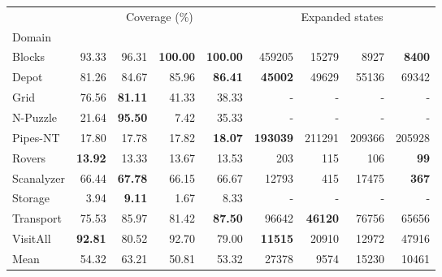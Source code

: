 \begin{tabular}{lrrrrrrrr}
    & \multicolumn{4}{c}{Coverage (\%)} & \multicolumn{4}{c}{Expanded states} \\
    \cmidrule(lr){2-5} \cmidrule(lr){6-9}
    Domain & \hnnl{\rlfacts} & \hnnl{\rlmeanfx} & \hnnnomutexl{\rlfacts} & \hnnnomutexl{\rlmeanfx} & \hnnl{\rlfacts} & \hnnl{\rlmeanfx} & \hnnnomutexl{\rlfacts} & \hnnnomutexl{\rlmeanfx} \\
    \midrule
    Blocks & 93.33 & 96.31 & \textbf{100.00} & \textbf{100.00} & 459205 & 15279 & 8927 & \textbf{8400} \\
    Depot & 81.26 & 84.67 & 85.96 & \textbf{86.41} & \textbf{45002} & 49629 & 55136 & 69342 \\
    Grid & 76.56 & \textbf{81.11} & 41.33 & 38.33 & - & - & - & - \\
    N-Puzzle & 21.64 & \textbf{95.50} & 7.42 & 35.33 & - & - & - & - \\
    Pipes-NT & 17.80 & 17.78 & 17.82 & \textbf{18.07} & \textbf{193039} & 211291 & 209366 & 205928 \\
    Rovers & \textbf{13.92} & 13.33 & 13.67 & 13.53 & 203 & 115 & 106 & \textbf{99} \\
    Scanalyzer & 66.44 & \textbf{67.78} & 66.15 & 66.67 & 12793 & 415 & 17475 & \textbf{367} \\
    Storage & 3.94 & \textbf{9.11} & 1.67 & 8.33 & - & - & - & - \\
    Transport & 75.53 & 85.97 & 81.42 & \textbf{87.50} & 96642 & \textbf{46120} & 76756 & 65656 \\
    VisitAll & \textbf{92.81} & 80.52 & 92.70 & 79.00 & \textbf{11515} & 20910 & 12972 & 47916 \\
    \midrule
    Mean & 54.32 & 63.21 & 50.81 & 53.32 & 27378 & 9574 & 15230 & 10461 \\
\end{tabular}
